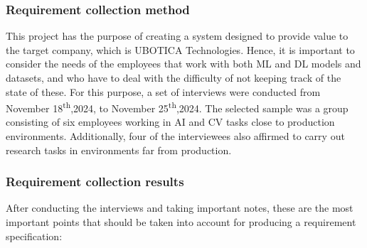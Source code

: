 \subsubsection{Requirement collection method}

This project has the purpose of creating a system designed to provide value to the target company, which is UBOTICA Technologies. Hence, it is important to consider the needs 
of the employees that work with both \acrshort{ML} and \acrshort{DL} models and datasets, and who have to deal with the difficulty of not keeping track of the state of these. 
For this purpose, a set of interviews were conducted from November 18\textsuperscript{th},2024, to November 25\textsuperscript{th},2024. The selected sample was a group consisting
of six employees working in \acrshort{AI} and \acrshort{CV} tasks close to production environments. Additionally, four of the interviewees also affirmed to carry out research tasks
in environments far from production.

\subsubsection{Requirement collection results}

After conducting the interviews and taking important notes, these are the most important points that should be taken into account for producing a requirement specification:

